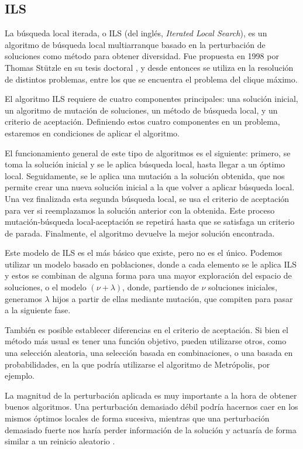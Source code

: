 \subsection{ILS}\label{ils}

La búsqueda local iterada, o ILS (del inglés, \textit{Iterated Local Search}), es
un algoritmo de búsqueda local multiarranque basado en la perturbación de soluciones
como método para obtener diversidad. Fue propuesta en 1998 por Thomas Stützle en
su tesis doctoral \citep{stuztle:1998}, y desde entonces se utiliza en la resolución
de distintos problemas, entre los que se encuentra el problema del clique máximo.

El algoritmo ILS requiere de cuatro componentes principales: una solución inicial,
un algoritmo de mutación de soluciones, un método de búsqueda local, y un criterio
de aceptación. Definiendo estos cuatro componentes en un problema, estaremos en
condiciones de aplicar el algoritmo.

El funcionamiento general de este tipo de algoritmos es el siguiente: primero, se
toma la solución inicial y se le aplica búsqueda local, hasta llegar a un óptimo local.
Seguidamente, se le aplica una mutación a la solución obtenida, que nos permite crear
una nueva solución inicial a la que volver a aplicar búsqueda local. Una vez finalizada
esta segunda búsqueda local, se usa el criterio de aceptación para ver si reemplazamos
la solución anterior con la obtenida. Este proceso mutación-búsqueda local-aceptación
se repetirá hasta que se satisfaga un criterio de parada. Finalmente, el algoritmo
devuelve la mejor solución encontrada.

Este modelo de ILS es el más básico que existe, pero no es el único. Podemos utilizar
un modelo basado en poblaciones, donde a cada elemento se le aplica ILS y estos se
combinan de alguna forma para una mayor exploración del espacio de soluciones, o el
modelo $(\nu + \lambda)$, donde, partiendo de $\nu$ soluciones iniciales, generamos
$\lambda$ hijos a partir de ellas mediante mutación, que compiten para pasar a la siguiente fase.

También es posible establecer diferencias en el criterio de aceptación. Si bien el
método más usual es tener una función objetivo, pueden utilizarse otros, como una
selección aleatoria, una selección basada en combinaciones, o una basada en probabilidades,
en la que podría utilizarse el algoritmo de Metrópolis, por ejemplo.

La magnitud de la perturbación aplicada es muy importante a la hora de obtener
buenos algoritmos. Una perturbación demasiado débil podría hacernos caer en los
mismos óptimos locales de forma sucesiva, mientras que una perturbación demasiado
fuerte nos haría perder información de la solución y actuaría de forma similar a
un reinicio aleatorio \citep{herrera:2014}.

